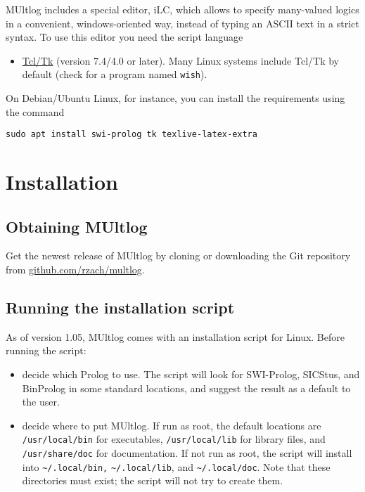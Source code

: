 \documentclass[]{article}
\providecommand{\tightlist}{%
  \setlength{\itemsep}{0pt}\setlength{\parskip}{0pt}}
\begin{document}
MUltlog includes a special editor, iLC, which allows to specify
many-valued logics in a convenient, windows-oriented way, instead of
typing an ASCII text in a strict syntax. To use this editor you need the
script language

\begin{itemize}
\tightlist
\item
  \href{https://www.tcl.tk/}{Tcl/Tk} (version 7.4/4.0 or later). Many
  Linux systems include Tcl/Tk by default (check for a program named
  \texttt{wish}).
\end{itemize}

On Debian/Ubuntu Linux, for instance, you can install the requirements
using the command

\begin{verbatim}
sudo apt install swi-prolog tk texlive-latex-extra
\end{verbatim}

\hypertarget{installation}{%
\section{Installation}\label{installation}}

\hypertarget{obtaining-multlog}{%
\subsection{Obtaining MUltlog}\label{obtaining-multlog}}

Get the newest release of MUltlog by cloning or downloading the Git
repository from
\href{https://github.com/rzach/multlog}{github.com/rzach/multlog}.

\hypertarget{running-the-installation-script}{%
\subsection{Running the installation
script}\label{running-the-installation-script}}

As of version 1.05, MUltlog comes with an installation script for Linux.
Before running the script:

\begin{itemize}
\item
  decide which Prolog to use. The script will look for SWI-Prolog,
  SICStus, and BinProlog in some standard locations, and suggest the
  result as a default to the user.
\item
  decide where to put MUltlog. If run as root, the default locations are
  \texttt{/usr/local/bin} for executables, \texttt{/usr/local/lib} for
  library files, and \texttt{/usr/share/doc} for documentation. If not
  run as root, the script will install into
  \texttt{\textasciitilde{}/.local/bin,}
  \texttt{\textasciitilde{}/.local/lib}, and
  \texttt{\textasciitilde{}/.local/doc}. Note that these directories
  must exist; the script will not try to create them.
\end{itemize}
\end{document}
